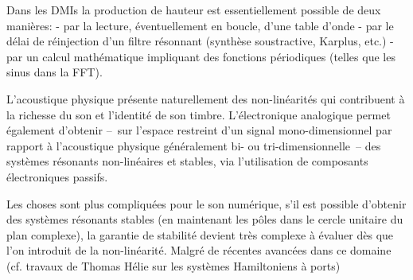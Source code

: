 Dans les DMIs la production de hauteur est essentiellement possible de deux manières: 
- par la lecture, éventuellement en boucle, d'une table d'onde
- par le délai de réinjection d'un filtre résonnant (synthèse soustractive, Karplus, etc.)
- par un calcul mathématique impliquant des fonctions périodiques (telles que les sinus dans la FFT).

L'acoustique physique présente naturellement des non-linéarités qui contribuent à la richesse du son et l'identité de son timbre. L'électronique analogique permet également d'obtenir --~sur l'espace restreint d'un signal mono-dimensionnel par rapport à l'acoustique physique généralement bi- ou tri-dimensionnelle~-- des systèmes résonants non-linéaires et stables, via l'utilisation de composants électroniques passifs.

Les choses sont plus compliquées pour le son numérique, s'il est possible d'obtenir des systèmes résonants stables (en maintenant les pôles dans le cercle unitaire du plan complexe), la garantie de stabilité devient très complexe à évaluer dès que l'on introduit de la non-linéarité.
Malgré de récentes avancées dans ce domaine (cf. travaux de Thomas Hélie sur les systèmes Hamiltoniens à ports)

